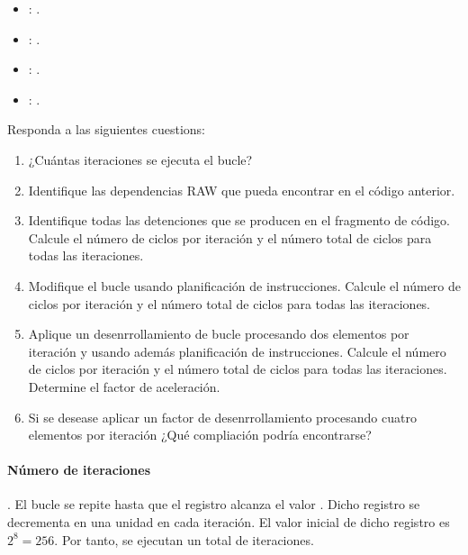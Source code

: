 \begin{itemize}
  \item {}: .
  \item {}: .
  \item {}: .
  \item {}: .
\end{itemize}

Responda a las siguientes cuestions:

\begin{enumerate}

\item ¿Cuántas iteraciones se ejecuta el bucle?

\item Identifique las dependencias RAW que pueda encontrar en el código
anterior.

\item Identifique todas las detenciones que se producen en el fragmento de código.
      Calcule el número de ciclos por iteración y el número total de ciclos
      para todas las iteraciones.

\item Modifique el bucle usando planificación de instrucciones.
      Calcule el número de ciclos por iteración y el número total de ciclos
      para todas las iteraciones.

\item Aplique un desenrrollamiento de bucle procesando dos elementos por
      iteración y usando además planificación de instrucciones.
      Calcule el número de ciclos por iteración y el número total de ciclos
      para todas las iteraciones.
      Determine el factor de aceleración.

\item Si se desease aplicar un factor de desenrrollamiento procesando cuatro
      elementos por iteración ¿Qué compliación podría encontrarse?

\end{enumerate}

\begin{acsolution}\end{acsolution}

\paragraph{Número de iteraciones}.
El bucle se repite hasta que el registro  alcanza el valor
. Dicho registro se decrementa en una unidad en cada iteración.
El valor inicial de dicho registro es $2^8 = 256$. Por tanto, se ejecutan
un total de  iteraciones.

